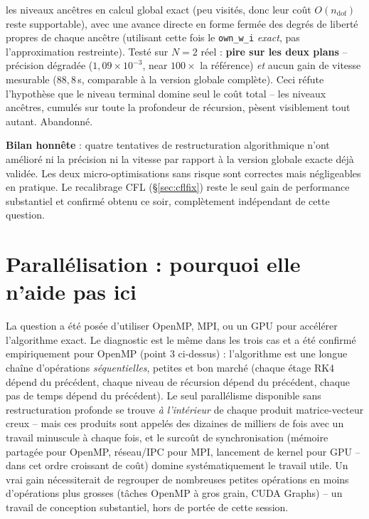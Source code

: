 \documentclass[11pt]{article}
\begin{document}
\begin{enumerate}
  les niveaux ancêtres en calcul global exact (peu visités, donc leur
  coût $O(n_{\text{dof}})$ reste supportable), avec une avance directe en
  forme fermée des degrés de liberté propres de chaque ancêtre (utilisant
  cette fois le \texttt{own\_w\_i} \emph{exact}, pas l'approximation
  restreinte). Testé sur $N=2$ réel : \textbf{pire sur les deux plans} --
  précision dégradée ($1{,}09\times10^{-3}$, near $100\times$ la
  référence) \emph{et} aucun gain de vitesse mesurable ($88{,}8$\,s,
  comparable à la version globale complète). Ceci réfute l'hypothèse que
  le niveau terminal domine seul le coût total -- les niveaux ancêtres,
  cumulés sur toute la profondeur de récursion, pèsent visiblement tout
  autant. Abandonné.
\end{enumerate}

\textbf{Bilan honnête} : quatre tentatives de restructuration
algorithmique n'ont amélioré ni la précision ni la vitesse par rapport
à la version globale exacte déjà validée. Les deux micro-optimisations
sans risque sont correctes mais négligeables en pratique. Le
recalibrage CFL (\S\ref{sec:cflfix}) reste le seul gain de performance
substantiel et confirmé obtenu ce soir, complètement indépendant de
cette question.

\section{Parallélisation : pourquoi elle n'aide pas ici}
\label{sec:parallel}

La question a été posée d'utiliser OpenMP, MPI, ou un GPU pour
accélérer l'algorithme exact. Le diagnostic est le même dans les trois
cas et a été confirmé empiriquement pour OpenMP (point 3 ci-dessus) :
l'algorithme est une longue chaîne d'opérations \emph{séquentielles},
petites et bon marché (chaque étage RK4 dépend du précédent, chaque
niveau de récursion dépend du précédent, chaque pas de temps dépend du
précédent). Le seul parallélisme disponible sans restructuration
profonde se trouve \emph{à l'intérieur} de chaque produit
matrice-vecteur creux -- mais ces produits sont appelés des dizaines de
milliers de fois avec un travail minuscule à chaque fois, et le
surcoût de synchronisation (mémoire partagée pour OpenMP, réseau/IPC
pour MPI, lancement de kernel pour GPU -- dans cet ordre croissant de
coût) domine systématiquement le travail utile. Un vrai gain
nécessiterait de regrouper de nombreuses petites opérations en moins
d'opérations plus grosses (tâches OpenMP à gros grain, CUDA Graphs) --
un travail de conception substantiel, hors de portée de cette session.
\end{document}
